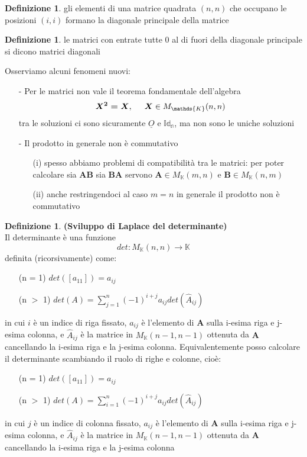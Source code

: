 \documentclass[a4paper, 12pt]{article}
\theoremstyle{definition}
\newtheorem{defn}[thm]{Definizione}
\begin{document}
\begin{defn}
    gli elementi di una matrice quadrata $(n,n)$ che occupano le posizioni $(i,i)$ formano la diagonale principale della matrice
\end{defn}
\begin{defn}
    le matrici con entrate tutte 0 al di fuori della diagonale principale si dicono matrici diagonali
\end{defn}
\noindent Osserviamo alcuni fenomeni nuovi:
\begin{itemize}
\item [-] Per le matrici non vale il teorema fondamentale dell'algebra
\[ \boldsymbol{X^2 = X}, \hspace{0.5cm} \boldsymbol{X} \in M_\mathds{K}(n,n) \]
tra le soluzioni ci sono sicuramente $\underline{O}$ e $\mathds{Id_n}$, ma non sono le uniche soluzioni
\item [-] Il prodotto in generale non è commutativo
\begin{itemize}
    \item [(i)] spesso abbiamo problemi di compatibilità tra le matrici: per poter calcolare sia $\boldsymbol{AB}$ sia $\boldsymbol{BA}$ servono $\boldsymbol{A} \in M_\mathds{K}(m,n)$ e $\boldsymbol{B} \in M_\mathds{K}(n,m)$
    \item [(ii)] anche restringendoci al caso $m = n$ in generale il prodotto non è commutativo
\end{itemize}
\end{itemize}
\newpage
\begin{defn} \textbf{(Sviluppo di Laplace del determinante)} \\
    Il determinante è una funzione 
    \[ 
        det: M_{\mathds{K}}(n,n)\rightarrow\mathds{K}
    \]
    definita (ricorsivamente) come: 
    \begin{itemize}
        \item [(n = 1)] $det([a_{11}]) = a_{ij}$
        \item [(n $>$ 1)] $det(A) = \sum\limits_{j=1}^{n}(-1)^{i+j}a_{ij}det(\hat{A}_{ij})$
    \end{itemize}
    in cui $i$ è un indice di riga fissato, $a_{ij}$ è l'elemento di $\boldsymbol{A}$ sulla i-esima riga e j-esima colonna, e $\hat{A}_{ij}$ è la matrice in $M_\mathds{K}(n-1, n-1)$ ottenuta da $\boldsymbol{A}$ cancellando la i-esima riga e la j-esima colonna.  \medbreak
    \medbreak
    \noindent Equivalentemente posso calcolare il determinante scambiando il ruolo di righe e colonne, cioè:  \medbreak
    \begin{itemize}
        \item [(n = 1)] $det([a_{11}]) = a_{ij}$
        \item [(n $>$ 1)] $det(A) = \sum\limits_{i=1}^{n}(-1)^{i+j}a_{ij}det(\hat{A}_{ij})$
    \end{itemize}
    in cui $j$ è un indice di colonna fissato, $a_{ij}$ è l'elemento di $\boldsymbol{A}$ sulla i-esima riga e j-esima colonna, e $\hat{A}_{ij}$ è la matrice in $M_\mathds{K}(n-1, n-1)$ ottenuta da $\boldsymbol{A}$ cancellando la i-esima riga e la j-esima colonna
\end{defn}
\end{document}

